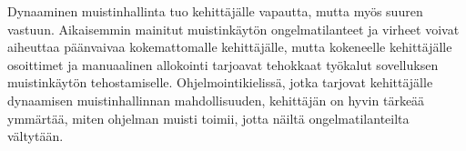 Dynaaminen muistinhallinta tuo kehittäjälle vapautta, mutta myös suuren vastuun. Aikaisemmin mainitut muistinkäytön ongelmatilanteet ja virheet voivat aiheuttaa päänvaivaa kokemattomalle kehittäjälle, mutta kokeneelle kehittäjälle osoittimet ja manuaalinen allokointi tarjoavat tehokkaat työkalut sovelluksen muistinkäytön tehostamiselle. Ohjelmointikielissä, jotka tarjovat kehittäjälle dynaamisen muistinhallinnan mahdollisuuden, kehittäjän on hyvin tärkeää ymmärtää, miten ohjelman muisti toimii, jotta näiltä ongelmatilanteilta vältytään.


